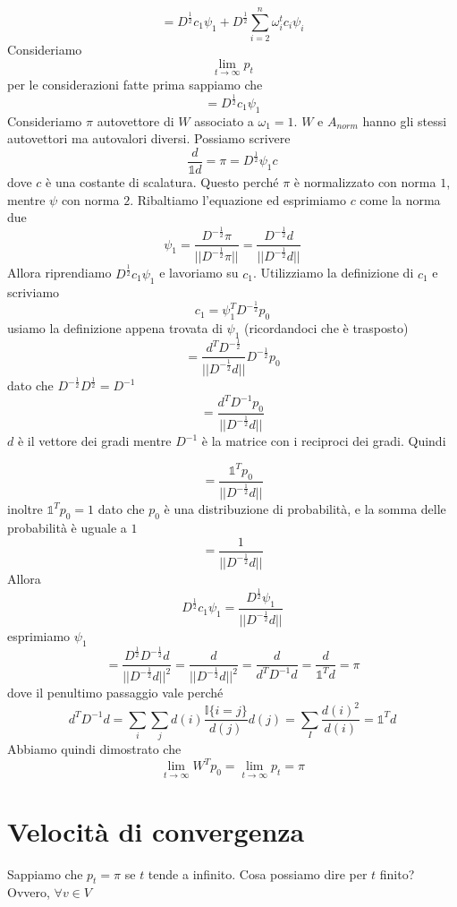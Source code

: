 \documentclass[12pt]{report}
\begin{document}
\begin{dimo}
    $$= D^{\frac{1}{2}} c_1 \psi_1 + D^{\frac{1}{2}} \sum_{i = 2}^n \omega_i^t c_i \psi_i$$
    Consideriamo 
    $$\lim_{t \rightarrow \infty} p_t$$
    per le considerazioni fatte prima sappiamo che
    $$= D^\frac{1}{2} c_1 \psi_1$$
    Consideriamo $\pi$ autovettore di $W$ associato a $\omega_1 = 1$. $W$ e $A_{norm}$ hanno gli stessi autovettori ma autovalori diversi. Possiamo scrivere
    $$\frac{d}{\mathds{1}d} = \pi = D^\frac{1}{2} \psi_1 c$$
    dove $c$ è una costante di scalatura. Questo perché $\pi$ è normalizzato con norma $1$, mentre $\psi$ con norma $2$. Ribaltiamo l'equazione ed esprimiamo $c$ come la norma due
    $$\psi_1 = \frac{D^{-\frac{1}{2}}\pi}{||D^{-\frac{1}{2}}\pi||} = \frac{D^{-\frac{1}{2}}d}{||D^{-\frac{1}{2}}d||}$$
    Allora riprendiamo $D^\frac{1}{2} c_1 \psi_1$ e lavoriamo su $c_1$. Utilizziamo la definizione di $c_1$ e scriviamo
    $$c_1 = \psi_1^T D^{-\frac{1}{2}} p_0 $$
    usiamo la definizione appena trovata di $\psi_1$ (ricordandoci che è trasposto)
    $$= \frac{d^T D^{-\frac{1}{2}}}{||D^{-\frac{1}{2}}d||} D^{-\frac{1}{2}} p_0 $$
    dato che $D^{-\frac{1}{2}} D^\frac{1}{2} = D^{-1}$
    $$= \frac{d^T D^{-1} p_0}{||D^{-\frac{1}{2}}d||}$$
    $d$ è il vettore dei gradi mentre $D^{-1}$ è la matrice con i reciproci dei gradi. Quindi

    $$= \frac{\mathds{1}^T p_0}{||D^{-\frac{1}{2}}d||}$$
    inoltre $\mathds{1}^T p_0 = 1$ dato che $p_0$ è una distribuzione di probabilità, e la somma delle probabilità è uguale a $1$
    $$= \frac{1}{||D^{-\frac{1}{2}}d||}$$
    Allora
    $$D^\frac{1}{2} c_1 \psi_1 = \frac{D^\frac{1}{2}\psi_1}{||D^{-\frac{1}{2}}d||}$$
    esprimiamo $\psi_1$
    $$= \frac{D^\frac{1}{2}D^{-\frac{1}{2}} d}{||D^{-\frac{1}{2}}d||^2} = \frac{d}{||D^{-\frac{1}{2}}d||^2} =  \frac{d}{d^T D^{-1}d} = \frac{d}{\mathds{1}^T d} = \pi$$
    dove il penultimo passaggio vale perché
    $$d^T D^{-1} d = \sum_i\sum_j d(i) \frac{\mathds{I}\{i=j\}}{d(j)} d(j) = \sum_I \frac{d(i)^2}{d(i)} = \mathds{1}^T d$$
    Abbiamo quindi dimostrato che 
    $$\lim_{t \rightarrow \infty} W^T p_0 = \lim_{t \rightarrow \infty} p_t = \pi $$
\end{dimo}

\section{Velocità di convergenza}

Sappiamo che $p_t = \pi$ se $t$ tende a infinito. Cosa possiamo dire per $t$ finito? Ovvero, $\forall v \in V$
\end{document}
